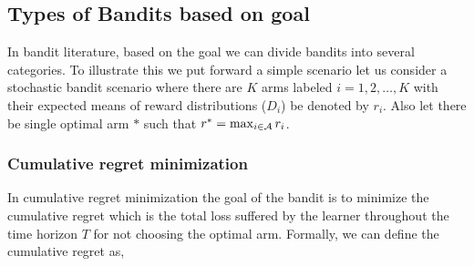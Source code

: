 %


%





\subsection{Types of Bandits based on goal}

In bandit literature, based on the goal we can divide bandits into several categories. To illustrate this we put forward a simple scenario let us consider a stochastic bandit scenario where there are $K$ arms labeled $i=1,2,\ldots, K$ with their expected means of reward distributions ($D_i$) be denoted by $r_i$. Also let there be single optimal arm $*$ such that $r^* = \max_{i\in\mathcal{A}}r_i$. 



\subsubsection{Cumulative regret minimization}
In cumulative regret minimization the goal of the bandit is to minimize the cumulative regret which is the total loss suffered by the learner throughout the time horizon $T$ for not choosing the optimal arm. Formally, we can define the cumulative regret as,

